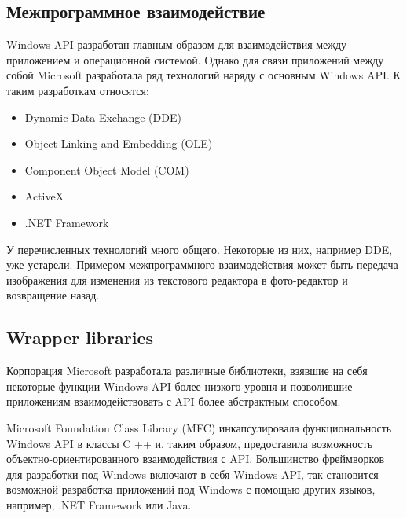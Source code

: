     \subsection{Межпрограммное взаимодействие}
    Windows API разработан главным образом для взаимодействия между приложением и операционной системой.
    Однако для связи приложений между собой Microsoft разработала ряд технологий наряду с основным Windows API. К таким разработкам относятся:
    \begin{itemize}
        \item Dynamic Data Exchange (DDE)
        \item Object Linking and Embedding (OLE)
        \item Component Object Model (COM)
        \item ActiveX
        \item .NET Framework
    \end{itemize}

    У перечисленных технологий много общего.
    Некоторые из них, например DDE, уже устарели.
    Примером межпрограммного взаимодействия может быть передача изображения для изменения из текстового редактора в фото-редактор и возвращение назад.
    \subsection{Wrapper libraries}
    Корпорация Microsoft разработала различные библиотеки, взявшие на себя некоторые функции Windows API более низкого уровня и позволившие приложениям взаимодействовать с API более абстрактным способом.

    Microsoft Foundation Class Library (MFC) инкапсулировала функциональность Windows API в классы C ++ и, таким образом, предоставила возможность объектно-ориентированного взаимодействия с API.
    Большинство фреймворков для разработки под Windows включают в себя Windows API, так становится возможной разработка приложений под Windows с помощью других языков, например, .NET Framework или Java.
